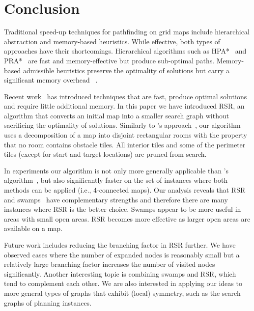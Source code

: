 \section{Conclusion}

Traditional speed-up techniques for pathfinding on grid maps 
include hierarchical abstraction and memory-based heuristics.
While effective, both types of approaches have their shortcomings.
Hierarchical algorithms such as HPA*~\cite{botea04} and PRA*~\cite{sturtevant07}
are fast and memory-effective but produce sub-optimal paths.
Memory-based admissible heuristics preserve the optimality of 
solutions but carry a significant memory overhead~
\cite{sturtevant09,goldberg05,Cazenave:06,bjornsson06}.

Recent work~\cite{pochter10,harabor10} has introduced
techniques that are fast, produce optimal solutions and
require little additional memory.
In this paper we have introduced RSR,
an algorithm that converts an initial map
into a smaller search graph without sacrificing the optimality of solutions.
Similarly to \citeauthor{harabor10}'s approach~,
our algorithm uses a decomposition of a map into disjoint rectangular
rooms with the property that no room contains obstacle tiles.
All interior tiles and some of the perimeter tiles 
(except for start and target locations)
are pruned from search.

In experiments our algorithm is not only more generally applicable
than \citeauthor{harabor10}'s algorithm~,
but also significantly faster on the set of instances where both
methods can be applied (i.e., 4-connected maps).
Our analysis reveals that RSR and swamps~\cite{pochter10}
have complementary strengths and therefore there are many
instances where RSR is the better choice.
Swamps appear to be more useful in areas with small open areas.
RSR becomes more effective as larger open areas are available on a map.


Future work includes reducing the branching factor in RSR further.
We have observed cases where the number of expanded nodes is reasonably small
but a relatively large branching factor increases the number of visited nodes significantly.
Another interesting topic is combining swamps and RSR, which tend to complement each other.
We are also interested in applying our ideas to more general types of graphs that exhibit
(local) symmetry, such as the search graphs of planning instances.


